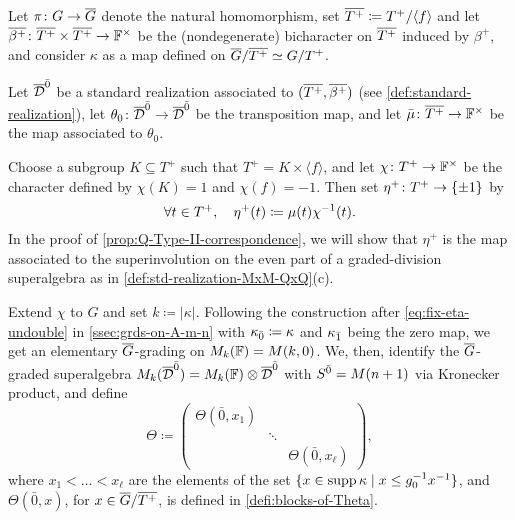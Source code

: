 Let $\pi\from G \to \barr G$ denote the natural homomorphism, set $\barr {T^+} \coloneqq T^+/\langle f \rangle$ and  let $\barr {\beta^+}\from \barr {T^+} \times \barr {T^+} \to \FF^\times$ be the (nondegenerate) bicharacter on $\barr {T^+}$ induced by $\beta^+$, and consider $\kappa$ as a map defined on $\barr G/\barr {T^+} \iso G/{T^+}$. 

Let $\barr \D\even$ be a standard realization associated to $(\barr{T^+}, \barr{\beta^+})$ (see \cref{def:standard-realization}), let $\theta_0\from \barr \D\even \to \barr \D\even$ be the transposition map, and let $\bar \mu\from \barr{T^+} \to \FF^\times$ be the map associated to $\theta_0$. 

Choose a subgroup $K \subseteq T^+$ such that $T^+ = K \times \langle f \rangle$, and let $\chi\colon T^+ \to \mathbb{F}^\times$ be the character defined by $\chi(K) = 1$ and $\chi(f) = -1$. 
Then set $\eta^+\colon T^+ \to \{ \pm 1 \}$ by
\[\label{eq:fix-eta-undouble-Q-v2}
    \forall t\in T^+, \quad \eta^+(t) \coloneqq \mu(t) \chi^{-1}(t).
\] 
In the proof of \cref{prop:Q-Type-II-correspondence}, we will show that $\eta^+$ is the map associated to the superinvolution on the even part of a graded-division superalgebra as in \cref{def:std-realization-MxM-QxQ}(c). 

Extend $\chi$ to $G$ and set $k \coloneqq |\kappa|$. 
Following the construction after \cref{eq:fix-eta-undouble} in \cref{ssec:grds-on-A-m-n} with $\kappa_{\bar{0}} \coloneqq \kappa$ and $\kappa_{\bar{1}}$ being the zero map, we get an elementary $\barr G$-grading on $M_k(\mathbb{F}) = M(k , 0)$. 
We, then, identify the $\barr G$-graded superalgebra $M_{k}(\barr \D\even) = M_{k}(\FF) \tensor \barr\D\even$ with $S^{\bar0} = M(n+1)$ via Kronecker product, and define 
\[\label{eq:puting-the-blocks-of-Phi-together-version-Q-v2}
    \Theta \coloneqq \begin{pmatrix}
        \Theta(\bar 0, x_1)&& \\
        & \ddots &\\
        && \Theta(\bar 0, x_{\ell})
    \end{pmatrix},
\]
where $x_1 < \ldots < x_{\ell}$ are the elements of the set $\{ x \in \operatorname{supp} \kappa \mid x \leq g_0^{-1} x^{-1} \}$, and $\Theta(\bar 0, x)$, for $x\in \barr G/\barr {T^+}$, is defined in \cref{defi:blocks-of-Theta}. 

